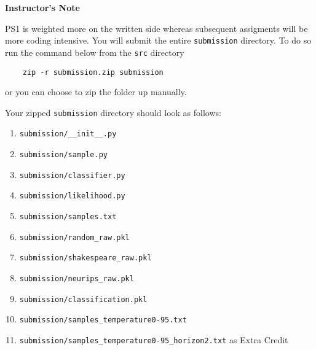 \textbf{Instructor's Note}

PS1 is weighted more on the written side whereas subsequent assigments will be more coding intensive. 
You will submit the entire \texttt{submission} directory. To do so run the command  below from the \texttt{src} directory
\begin{verbatim}
    zip -r submission.zip submission
\end{verbatim}

or you can choose to zip the folder up manually.

Your zipped \texttt{submission} directory should look as follows:
\begin{enumerate}
    \item \texttt{submission/\_\_init\_\_.py}
    \item \texttt{submission/sample.py}
    \item \texttt{submission/classifier.py}
    \item \texttt{submission/likelihood.py}
    \item \texttt{submission/samples.txt}
    \item \texttt{submission/random\_raw.pkl}
    \item \texttt{submission/shakespeare\_raw.pkl}
    \item \texttt{submission/neurips\_raw.pkl}
    \item \texttt{submission/classification.pkl}
    \item \texttt{submission/samples\_temperature0-95.txt}
    \item \texttt{submission/samples\_temperature0-95\_horizon2.txt} as Extra Credit
\end{enumerate}
